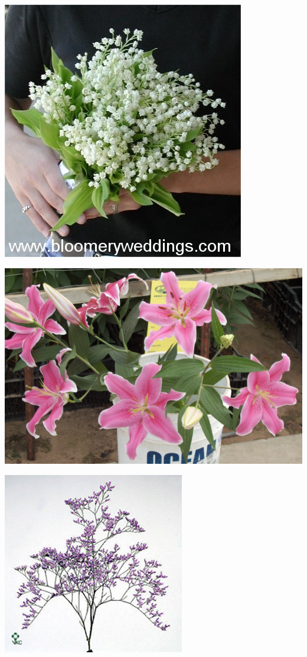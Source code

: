 \documentclass{article}
\begin{document}
\begin{center}
\includegraphics[height=0.925\paperheight]{../Lily-of-the-Valley_Bouquet.jpg}
\end{center}
\newpage

\begin{center}
\includegraphics[height=0.925\paperheight]{../Lily_Oriental.jpg}
\end{center}
\newpage

\begin{center}
\includegraphics[height=0.925\paperheight]{../Limonium_MistyBlue.jpg}
\end{center}
\newpage
\end{document}
